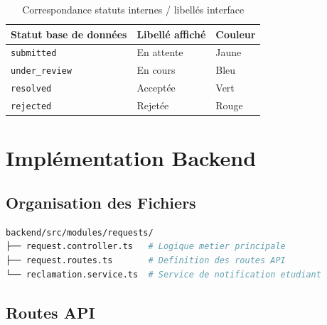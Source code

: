 \begin{table}[H]
\centering
\caption{Correspondance statuts internes / libellés interface}
\begin{tabular}{@{}lll@{}}
\toprule
\textbf{Statut base de données} & \textbf{Libellé affiché} & \textbf{Couleur} \\
\midrule
\texttt{submitted}     & En attente & Jaune \\
\texttt{under\_review} & En cours   & Bleu  \\
\texttt{resolved}      & Acceptée   & Vert  \\
\texttt{rejected}      & Rejetée    & Rouge \\
\bottomrule
\end{tabular}
\end{table}

\section{Implémentation Backend}

\subsection{Organisation des Fichiers}

\begin{lstlisting}[language=bash,
  caption=Structure du module requests côté backend]
backend/src/modules/requests/
├── request.controller.ts   # Logique metier principale
├── request.routes.ts       # Definition des routes API
└── reclamation.service.ts  # Service de notification etudiant
\end{lstlisting}

\subsection{Routes API}

